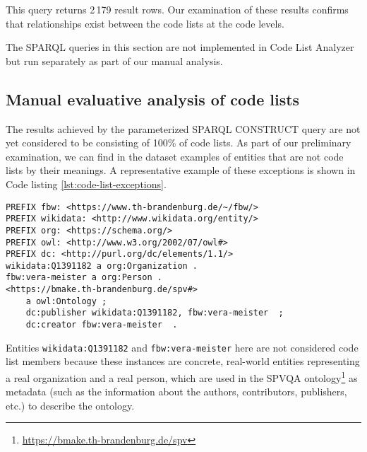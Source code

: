 This query returns 2\,179 result rows. Our examination of these results confirms that relationships exist between the code lists at the code levels.

The SPARQL queries in this section are not implemented in Code List Analyzer but run separately as part of our manual analysis. %

\subsection{Manual evaluative analysis of code lists}
\label{s:manual}
The results achieved by the parameterized SPARQL CONSTRUCT query are not yet considered to be consisting of 100\% of code lists. As part of our preliminary examination, we can find in the dataset examples of entities that are not code lists by their meanings. %
A representative example of these exceptions is shown in Code listing \ref{lst:code-list-exceptions}.

\begin{lstlisting}[captionpos=b,caption=Exception example in the extracted code list dataset,label=lst:code-list-exceptions,basicstyle=\footnotesize\ttfamily,frame=single]
PREFIX fbw: <https://www.th-brandenburg.de/~/fbw/>
PREFIX wikidata: <http://www.wikidata.org/entity/>
PREFIX org: <https://schema.org/>
PREFIX owl: <http://www.w3.org/2002/07/owl#>
PREFIX dc: <http://purl.org/dc/elements/1.1/>
wikidata:Q1391182 a org:Organization .
fbw:vera-meister a org:Person .
<https://bmake.th-brandenburg.de/spv#>
    a owl:Ontology ;
    dc:publisher wikidata:Q1391182, fbw:vera-meister  ;
    dc:creator fbw:vera-meister  .
\end{lstlisting}

Entities \texttt{wikidata:Q1391182} and \texttt{fbw:vera-meister} here are not considered code list members because these instances are concrete, real-world entities representing a real organization and a real person,
which are used in the SPVQA ontology\footnote{\url{https://bmake.th-brandenburg.de/spv}} as metadata (such as the information about the authors, contributors, publishers, etc.) to describe the ontology.

